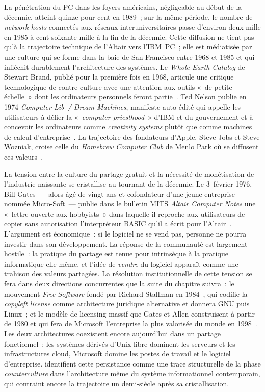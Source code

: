 %
La pénétration du PC dans les foyers américains, négligeable au début de la décennie, atteint quinze pour cent en 1989~; sur la même période, le nombre de \emph{network hosts} connectés aux réseaux interuniversitaires passe d'environ deux mille en 1985 à cent soixante mille à la fin de la décennie. Cette diffusion ne tient pas qu'à la trajectoire technique de l'Altair vers l'IBM~PC~; elle est médiatisée par une culture qui se forme dans la baie de San Francisco entre 1968 et 1985 et qui infléchit durablement l'architecture des systèmes. Le \emph{Whole Earth Catalog} de Stewart Brand, publié pour la première fois en 1968, articule une critique technologique de contre-culture avec une attention aux outils «~de petite échelle~» dont les ordinateurs personnels feront partie~\parencite{turner_counterculture_2008, kirk_whole_2001}. Ted Nelson publie en 1974 \emph{Computer Lib~/ Dream Machines}, manifeste auto-édité qui appelle les utilisateurs à défier la «~\emph{computer priesthood}~» d'IBM et du gouvernement et à concevoir les ordinateurs comme \emph{creativity systems} plutôt que comme machines de calcul d'entreprise~\parencite{nelson_computer_1974}. La trajectoire des fondateurs d'Apple, Steve Jobs et Steve Wozniak, croise celle du \emph{Homebrew Computer Club} de Menlo Park où se diffusent ces valeurs~\parencite{markoff_dormouse_2005, levy_hackers_1984}.

%
La tension entre la culture du partage gratuit et la nécessité de monétisation de l'industrie naissante se cristallise au tournant de la décennie. Le 3~février 1976, Bill Gates~--- alors âgé de vingt ans et cofondateur d'une jeune entreprise nommée Micro-Soft~--- publie dans le bulletin MITS \emph{Altair Computer Notes} une «~lettre ouverte aux hobbyists~» dans laquelle il reproche aux utilisateurs de copier sans autorisation l'interpréteur BASIC qu'il a écrit pour l'Altair~\parencite{gates_hobbyists_1976}. L'argument est économique~: si le logiciel ne se vend pas, personne ne pourra investir dans son développement. La réponse de la communauté est largement hostile~: la pratique du partage est tenue pour intrinsèque à la pratique informatique elle-même, et l'idée de \emph{vendre} du logiciel apparaît comme une trahison des valeurs partagées. La résolution institutionnelle de cette tension se fera dans deux directions concurrentes que la suite du chapitre suivra~: le mouvement \emph{Free Software} fondé par Richard Stallman en 1984~\parencite{stallman_gnu_1984}, qui codifie la \emph{copyleft license} comme architecture juridique alternative et donnera GNU puis Linux~; et le modèle de licensing massif que Gates et Allen construisent à partir de 1980 et qui fera de Microsoft l'entreprise la plus valorisée du monde en 1998~\parencite{campbell_kelly_computer_2014}. Les deux architectures coexistent encore aujourd'hui dans un partage fonctionnel~: les systèmes dérivés d'Unix libre dominent les serveurs et les infrastructures cloud, Microsoft domine les postes de travail et le logiciel d'entreprise. \textcite{johnstone_deep_2026} identifient cette persistance comme une trace structurelle de la phase \emph{counterculture} dans l'architecture même du système informationnel contemporain, qui contraint encore la trajectoire un demi-siècle après sa cristallisation.

